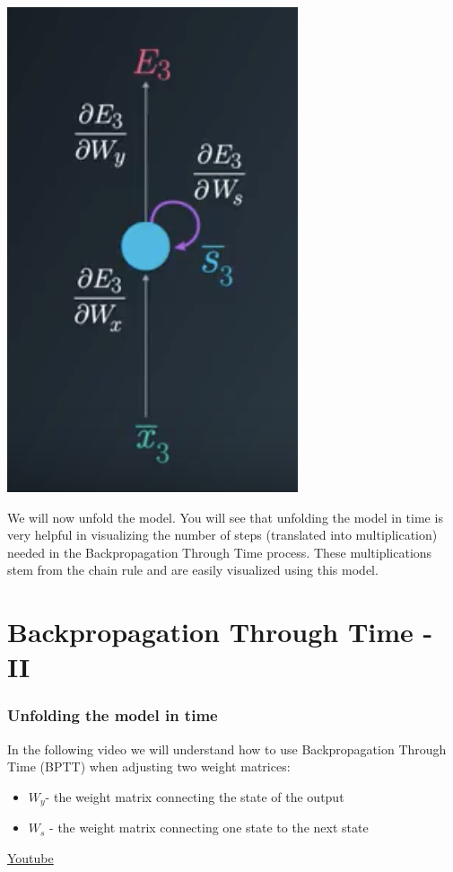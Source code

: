 \includegraphics[width=0.5\linewidth]{img//rnn//intro/screen-shot-2017-11-27-at-1.46.43-pm.png}

We will now unfold the model. You will see that unfolding the model in time is very helpful in visualizing the number of steps (translated into multiplication) needed in the Backpropagation Through Time process. These multiplications stem from the chain rule and are easily visualized using this model.


\section{Backpropagation Through Time - II}

\subsubsection{Unfolding the model in time}

In the following video we will understand how to use Backpropagation Through Time (BPTT) when adjusting two weight matrices:

\begin{itemize}
    \item \(W_y\)- the weight matrix connecting the state of the output
    \item \(W_s\) - the weight matrix connecting one state to the next state
\end{itemize}
\href{https://www.youtube.com/watch?v=bUU9BEQw0IA&ab_channel=Udacity}{Youtube} \newline



